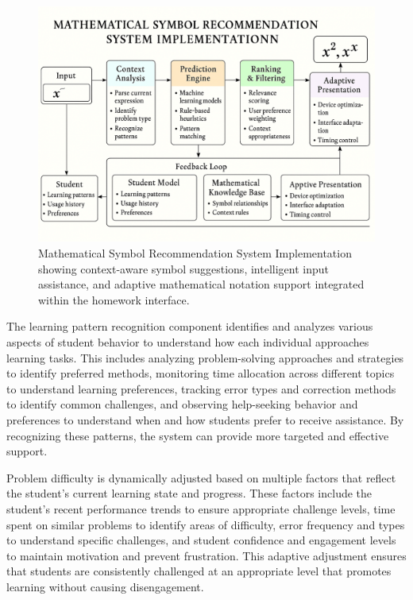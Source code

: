 \documentclass[conference]{IEEEtran}
\begin{document}
\begin{figure}[htbp]
\centerline{\includegraphics[width=\columnwidth]{6.png}}
\caption{Mathematical Symbol Recommendation System Implementation showing context-aware symbol suggestions, intelligent input assistance, and adaptive mathematical notation support integrated within the homework interface.}
\label{fig:symbol_system}
\end{figure}

The learning pattern recognition component identifies and analyzes various aspects of student behavior to understand how each individual approaches learning tasks. This includes analyzing problem-solving approaches and strategies to identify preferred methods, monitoring time allocation across different topics to understand learning preferences, tracking error types and correction methods to identify common challenges, and observing help-seeking behavior and preferences to understand when and how students prefer to receive assistance. By recognizing these patterns, the system can provide more targeted and effective support.

Problem difficulty is dynamically adjusted based on multiple factors that reflect the student's current learning state and progress. These factors include the student's recent performance trends to ensure appropriate challenge levels, time spent on similar problems to identify areas of difficulty, error frequency and types to understand specific challenges, and student confidence and engagement levels to maintain motivation and prevent frustration. This adaptive adjustment ensures that students are consistently challenged at an appropriate level that promotes learning without causing disengagement.
\end{document}
